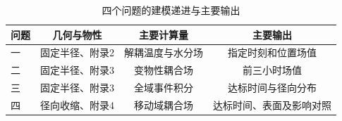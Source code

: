 \begin{table}[H]
\centering
\caption{四个问题的建模递进与主要输出}
\label{tab:problem-analysis}
\begin{tabular}{@{}lccc@{}}
\toprule
问题 & 几何与物性 & 主要计算量 & 主要输出 \\
\midrule
一 & 固定半径、附录2 & 解耦温度与水分场 & 指定时刻和位置场值 \\
二 & 固定半径、附录3 & 变物性耦合场 & 前三小时场值 \\
三 & 固定半径、附录3 & 全域事件积分 & 达标时间与径向分布 \\
四 & 径向收缩、附录4 & 移动域耦合场 & 达标时间、表面及影响对照 \\
\bottomrule
\end{tabular}
\end{table}
